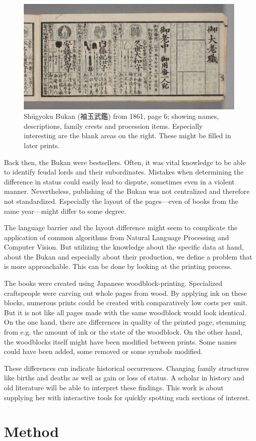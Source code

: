 \documentclass{ltjarticle}
\begin{document}
\begin{figure}[]
    \centering
    \includegraphics[width=\textwidth]{200019500_00006.jpg}
    \caption[Shūgyoku Bukan (袖玉武鑑), page 6]{Shūgyoku Bukan (袖玉武鑑) from 1861, page 6; showing names, descriptions, family crests and procession items. Especially interesting are the blank areas on the right. These might be filled in later prints.}
    \label{fig:shuugyokubukan006}
\end{figure}

Back then, the Bukan were bestsellers. Often, it was vital knowledge to be able to identify feudal lords and their subordinates. Mistakes when determining the difference in status could easily lead to dispute, sometimes even in a violent manner.\cite{dower1990elements} Nevertheless, publishing of the Bukan was not centralized and therefore not standardized. Especially the layout of the pages---even of books from the same year---might differ to some degree.

The language barrier and the layout difference might seem to complicate the application of common algorithms from Natural Language Processing and Computer Vision. But utilizing the knowledge about the specific data at hand, about the Bukan and especially about their production, we define a problem that is more approachable. This can be done by looking at the printing process.

The books were created using Japanese woodblock-printing. Specialized craftspeople were carving out whole pages from wood. By applying ink on these blocks, numerous prints could be created with comparatively low costs per unit. But it is not like all pages made with the same woodblock would look identical. On the one hand, there are differences in quality of the printed page, stemming from e.g. the amount of ink or the state of the woodblock. On the other hand, the woodblocks itself might have been modified between prints. Some names could have been added, some removed or some symbols modified.

These differences can indicate historical occurrences. Changing family structures like births and deaths as well as gain or loss of status. A scholar in history and old literature will be able to interpret these findings. This work is about supplying her with interactive tools for quickly spotting such sections of interest.

\section{Method}

\printbibliography
\end{document}
